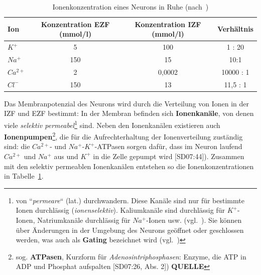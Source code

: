 {\renewcommand{\arraystretch}{1.5}%
\begin{table} %
 \centering
 \begin{tabular}{l | c | c | c }
  \textbf{Ion} & \textbf{Konzentration EZF (mmol/l)} & \textbf{Konzentration IZF (mmol/l)} & \textbf{Verhältnis} \\
  \hline
  $K^+$      & 5 & 100 & 1 : 20 \\
  $Na^+$     & 150 & 15 & 10:1 \\
  $Ca^{2+}$  & 2 & 0,0002 & 10000 : 1 \\
  $Cl^-$     & 150 & 13 & 11,5 : 1 \\
 \end{tabular}
 \caption{Ionenkonzentration eines Neurons in Ruhe (nach~\cite[75, Abb. 3.15]{BCP18})}
 \label{tab:ionenkonzentration}
\end{table}


Das Membranpotenzial des Neurons wird durch die Verteilung von Ionen in der IZF und EZF bestimmt: In der Membran befinden sich \textbf{Ionenkanäle}, von denen viele \textit{selektiv permeabel}\footnote{
 von ``\textit{permeare}`` (lat.) durchwandern. Diese Kanäle sind nur für bestimmte Ionen durchlässig (\textit{ionenselektiv}). Kaliumkanäle sind durchlässig für $K^+$-Ionen, Natriumkanäle durchlässig für $Na^+$-Ionen usw. (vgl.~\cite[66]{BCP18}).
 Sie können über Änderungen in der Umgebung des Neurons geöffnet oder geschlossen werden, was auch als \textbf{Gating} bezeichnet wird (vgl.~\cite[108]{KSJ+13})
} sind.
Neben den Ionenkanälen existieren auch \textbf{Ionenpumpen}\footnote{
 sog. \textbf{ATPasen}, Kurzform für \textit{Adenosintriphosphasen}: Enzyme, die ATP in ADP und Phosphat aufspalten {[SD07:26, Abs. 2]}) \textbf{QUELLE}
}, die für die Aufrechterhaltung der Ionenverteilung zuständig sind: die $Ca^{2+}$- und $Na^+$-$K^+$-ATPasen sorgen dafür, dass im Neuron laufend  $Ca^{2+}$ und $Na^+$ aus und $K^+$ in die Zelle gepumpt wird [SD07:44]).
Zusammen mit den selektiv permeablen Ionenkanälen entstehen so die Ionenkonzentrationen in Tabelle~\ref{tab:ionenkonzentration}.\\


}
